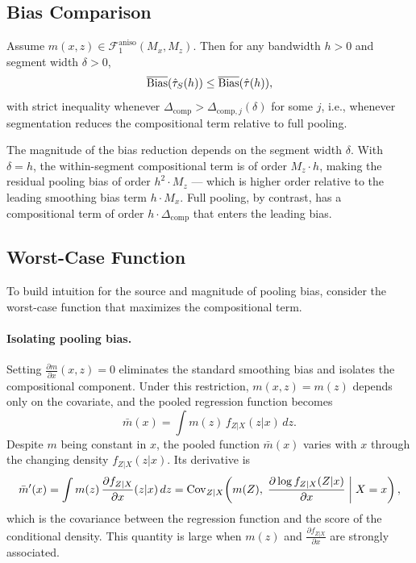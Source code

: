 \subsection{Bias Comparison}\label{sec:bias:comparison}

\begin{proposition}\label{prop:bias_comparison}
	Assume $m(x,z) \in \mathcal{F}_1^{\mathrm{aniso}}(M_x, M_z)$.
	Then for any bandwidth $h > 0$ and segment width $\delta > 0$,
	\begin{equation}\label{eq:bias_comparison}
		\overline{\mathrm{Bias}}(\hat{\tau}_S(h)) \leq \overline{\mathrm{Bias}}(\hat{\tau}(h)),
	\end{equation}
	with strict inequality whenever $\Delta_{\mathrm{comp}} > \Delta_{\mathrm{comp},j}(\delta)$ for some $j$, i.e., whenever segmentation reduces the compositional term relative to full pooling.
\end{proposition}

The magnitude of the bias reduction depends on the segment width $\delta$.
With $\delta = h$, the within-segment compositional term is of order $M_z \cdot h$, making the residual pooling bias of order $h^2 \cdot M_z$ --- which is higher order relative to the leading smoothing bias term $h \cdot M_x$.
Full pooling, by contrast, has a compositional term of order $h \cdot \Delta_{\mathrm{comp}}$ that enters the leading bias.


\subsection{Worst-Case Function}\label{sec:bias:worst_case}

To build intuition for the source and magnitude of pooling bias, consider the worst-case function that maximizes the compositional term.

\paragraph{Isolating pooling bias.}
Setting $\frac{\partial m}{\partial x}(x,z) = 0$ eliminates the standard smoothing bias and isolates the compositional component.
Under this restriction, $m(x,z) = m(z)$ depends only on the covariate, and the pooled regression function becomes
\begin{equation}\label{eq:mbar_pure_comp}
	\bar{m}(x) = \int m(z)\, f_{Z|X}(z|x)\, dz.
\end{equation}
Despite $m$ being constant in $x$, the pooled function $\bar{m}(x)$ varies with $x$ through the changing density $f_{Z|X}(z|x)$.
Its derivative is
\begin{equation}\label{eq:mbar_prime_pure}
	\bar{m}'(x) = \int m(z)\, \frac{\partial f_{Z|X}}{\partial x}(z|x)\, dz = \operatorname{Cov}_{Z|X}\!\left(m(Z),\; \frac{\partial \log f_{Z|X}(Z|x)}{\partial x} \;\bigg|\; X = x\right),
\end{equation}
which is the covariance between the regression function and the score of the conditional density.
This quantity is large when $m(z)$ and $\frac{\partial f_{Z|X}}{\partial x}$ are strongly associated.

